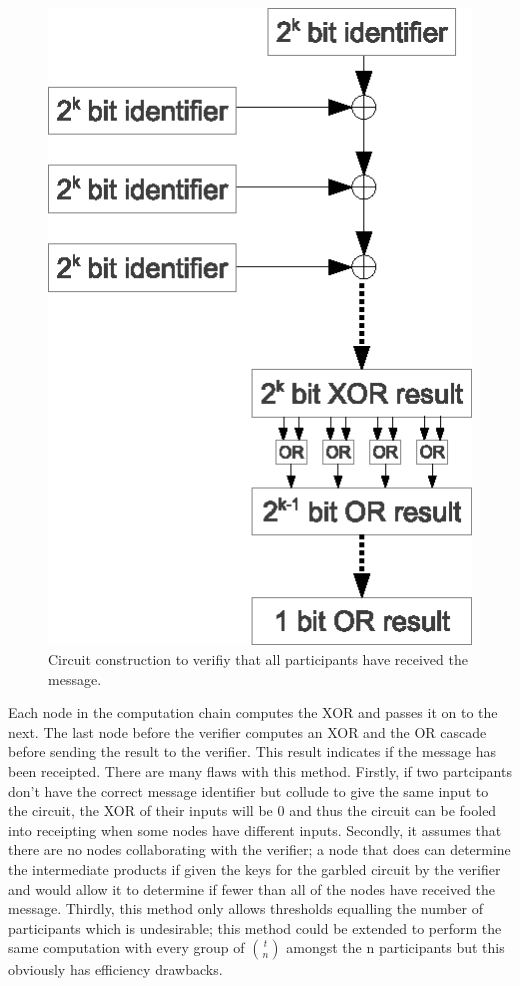 \documentclass[ %
                    author={Luke Murray},
                supervisor={Dr. Simon Hollis},
                     title={Shadow Peer-to-Peer Networks},
                  subtitle={},
                    degree={MEng},
                      year={2013} ]{thesis}
\begin{document}
\begin{figure}[h]
    \centering
    \includegraphics{diagrams/yao_receipting2.eps}
    \caption{Circuit construction to verifiy that all participants have received the message.}
    \label{yao}
\end{figure}

Each node in the computation chain computes the XOR and passes it on to the next. The last node before the verifier computes an XOR and the OR cascade before sending the result to the verifier. This result indicates if the message has been receipted. There are many flaws with this method. Firstly, if two partcipants don't have the correct message identifier but collude to give the same input to the circuit, the XOR of their inputs will be 0 and thus the circuit can be fooled into receipting when some nodes have different inputs. Secondly, it assumes that there are no nodes collaborating with the verifier; a node that does can determine the intermediate products if given the keys for the garbled circuit by the verifier and would allow it to determine if fewer than all of the nodes have received the message. Thirdly, this method only allows thresholds equalling the number of participants which is undesirable; this method could be extended to perform the same computation with every group of {$t \choose n$} amongst the n participants but this obviously has efficiency drawbacks.
\end{document}
